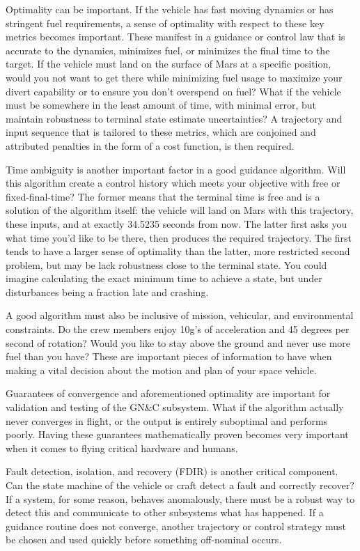Optimality can be important. If the vehicle has fast moving dynamics or has stringent fuel requirements, a sense of optimality with respect to these key metrics becomes important. These manifest in a guidance or control law that is accurate to the dynamics, minimizes fuel, or minimizes the final time to the target. If the vehicle must land on the surface of Mars at a specific position, would you not want to get there while minimizing fuel usage to maximize your divert capability or to ensure you don't overspend on fuel? What if the vehicle must be somewhere in the least amount of time, with minimal error, but maintain robustness to terminal state estimate uncertainties? A trajectory and input sequence that is tailored to these metrics, which are conjoined and attributed penalties in the form of a cost function, is then required.

Time ambiguity is another important factor in a good guidance algorithm. Will this algorithm create a control history which meets your objective with free or fixed-final-time? The former means that the terminal time is free and is a solution of the algorithm itself: the vehicle will land on Mars with this trajectory, these inputs, and at exactly 34.5235 seconds from now. The latter first asks you what time you'd like to be there, then produces the required trajectory. The first tends to have a larger sense of optimality than the latter, more restricted second problem, but may be lack robustness close to the terminal state. You could imagine calculating the exact minimum time to achieve a state, but under disturbances being a fraction late and crashing.

A good algorithm must also be inclusive of mission, vehicular, and environmental constraints. Do the crew members enjoy 10g's of acceleration and 45 degrees per second of rotation? Would you like to stay above the ground and never use more fuel than you have? These are important pieces of information to have when making a vital decision about the motion and plan of your space vehicle.

Guarantees of convergence and aforementioned optimality are important for validation and testing of the GN\&C subsystem. What if the algorithm actually never converges in flight, or the output is entirely suboptimal and performs poorly. Having these guarantees mathematically proven becomes very important when it comes to flying critical hardware and humans.

Fault detection, isolation, and recovery (FDIR) is another critical component. Can the state machine of the vehicle or craft detect a fault and correctly recover? If a system, for some reason, behaves anomalously, there must be a robust way to detect this and communicate to other subsystems what has happened. If a guidance routine does not converge, another trajectory or control strategy must be chosen and used quickly before something off-nominal occurs.

